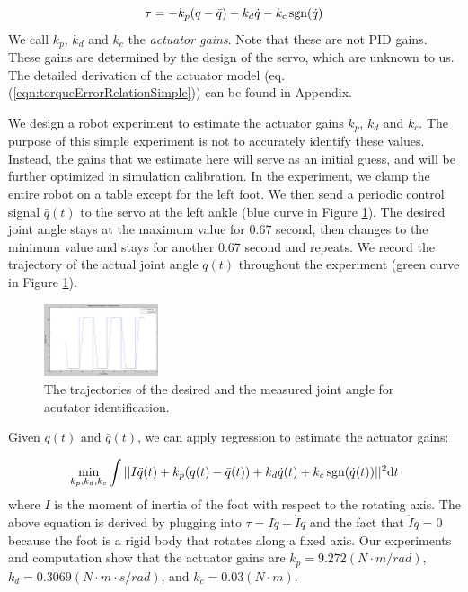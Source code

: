 \begin{equation}
  \tau = -k_p(q-\bar{q}) - k_d\dot{q} - k_c\operatorname{sgn}(\dot{q})\\
    \label{eqn:torqueErrorRelationSimple}
\end{equation}
We call $k_p$, $k_d$ and $k_c$ the \emph{actuator gains}. Note that these are not PID gains. These gains are determined by the design of the servo, which are unknown to us. The detailed derivation of the actuator model (eq. (\ref{eqn:torqueErrorRelationSimple})) can be found in Appendix.

We design a robot experiment to estimate the actuator gains $k_p$, $k_d$ and $k_c$. The purpose of this simple experiment is not to accurately identify these values. Instead, the gains that we estimate here will serve as an initial guess, and will be further optimized in simulation calibration. In the experiment, we clamp the entire robot on a table except for the left foot. We then send a periodic control signal $\bar{q}(t)$ to the servo at the left ankle (blue curve in Figure \ref{fig:actuatorId}). The desired joint angle stays at the maximum value for 0.67 second, then changes to the minimum value and stays for another 0.67 second and repeats. We record the trajectory of the actual joint angle $q(t)$ throughout the experiment (green curve in Figure \ref{fig:actuatorId}). 

\begin{figure}[!t]
  \centering
  \includegraphics[width=0.3\textwidth]{figures/actuatorId}
  \caption{The trajectories of the desired and the measured joint angle for acutator identification.}
  \vspace{-0.1in}
  \label{fig:actuatorId}
\end{figure}

Given $q(t)$ and $\bar{q}(t)$, we can apply regression to estimate the actuator gains:

\begin{displaymath}
\min_{k_p, k_d, k_c}\int||I\ddot{q}(t)+k_p(q(t)-\bar{q}(t)) + k_d\dot{q}(t) + k_c\operatorname{sgn}(\dot{q}(t))||^2\mathrm{d}t
\end{displaymath}
where $I$ is the moment of inertia of the foot with respect to the rotating axis. The above equation is derived by plugging into $\tau = I\ddot{q}+\dot{I}\dot{q}$ and the fact that $\dot{I}\dot{q}=0$ because the foot is a rigid body that rotates along a fixed axis. Our experiments and computation show that the actuator gains are $k_p=9.272(N\cdot m/rad)$, $k_d=0.3069(N\cdot m\cdot s/rad)$, and $k_c=0.03(N\cdot m)$. 


